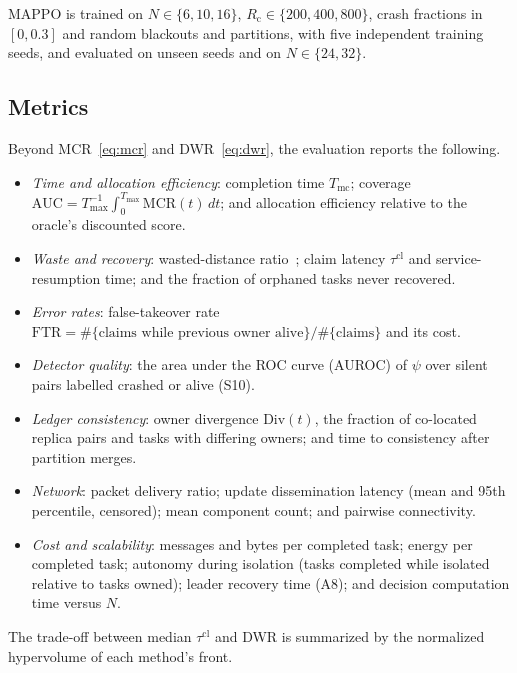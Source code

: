 \documentclass[journal]{IEEEtran}
\newcommand{\Rc}{R_{\mathrm{c}}}
\begin{document}
MAPPO is trained on $N\in\{6,10,16\}$, $\Rc\in\{200,400,800\}$, crash fractions in $[0,0.3]$ and random blackouts and partitions, with five independent training seeds, and evaluated on unseen seeds and on $N\in\{24,32\}$.

\subsection{Metrics}
Beyond MCR~\eqref{eq:mcr} and DWR~\eqref{eq:dwr}, the evaluation reports the following.
\begin{itemize}
\item \emph{Time and allocation efficiency}: completion time $T_{\mathrm{mc}}$; coverage $\mathrm{AUC}=T_{\max}^{-1}\int_0^{T_{\max}}\mathrm{MCR}(t)\,dt$; and allocation efficiency relative to the oracle's discounted score.
\item \emph{Waste and recovery}: wasted-distance ratio~\cite{R66_liu2026}; claim latency $\tau^{\mathrm{cl}}$ and service-resumption time; and the fraction of orphaned tasks never recovered.
\item \emph{Error rates}: false-takeover rate $\mathrm{FTR}=\#\{\text{claims while previous owner alive}\}/\#\{\text{claims}\}$ and its cost.
\item \emph{Detector quality}: the area under the ROC curve (AUROC) of $\psi$ over silent pairs labelled crashed or alive (S10).
\item \emph{Ledger consistency}: owner divergence $\mathrm{Div}(t)$, the fraction of co-located replica pairs and tasks with differing owners; and time to consistency after partition merges.
\item \emph{Network}: packet delivery ratio; update dissemination latency (mean and 95th percentile, censored); mean component count; and pairwise connectivity.
\item \emph{Cost and scalability}: messages and bytes per completed task; energy per completed task; autonomy during isolation (tasks completed while isolated relative to tasks owned); leader recovery time (A8); and decision computation time versus $N$.
\end{itemize}
The trade-off between median $\tau^{\mathrm{cl}}$ and DWR is summarized by the normalized hypervolume of each method's front.
\end{document}
